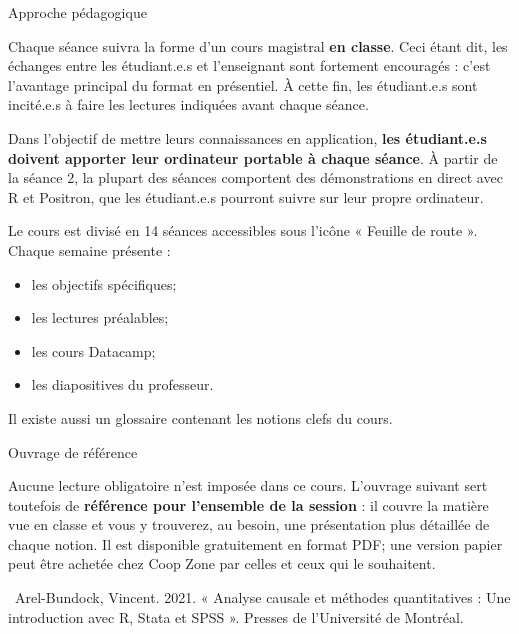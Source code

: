 \documentclass[10pt]{article}
\newcommand{\ulsub}[1]{%
  \needspace{3\baselineskip}%
  \vspace{10pt}%
  {\headfont\fontsize{12.5}{15}\selectfont #1}\par
  \vspace{2pt}%
}
\begin{document}
\ulsub{Approche pédagogique}
{\fontsize{9.5}{12.5}\selectfont
Chaque séance suivra la forme d'un cours magistral \textbf{en classe}. Ceci étant dit, les échanges entre les étudiant.e.s et l'enseignant sont fortement encouragés : c'est l'avantage principal du format en présentiel. À cette fin, les étudiant.e.s sont incité.e.s à faire les lectures indiquées avant chaque séance.\par
\vspace{6pt}
Dans l'objectif de mettre leurs connaissances en application, \textbf{les étudiant.e.s doivent apporter leur ordinateur portable à chaque séance}. À partir de la séance 2, la plupart des séances comportent des démonstrations en direct avec R et Positron, que les étudiant.e.s pourront suivre sur leur propre ordinateur.\par
\vspace{6pt}
Le cours est divisé en 14 séances accessibles sous l'icône « Feuille de route ». Chaque semaine présente :
\begin{itemize}
  \item les objectifs spécifiques;
  \item les lectures préalables;
  \item les cours Datacamp;
  \item les diapositives du professeur.
\end{itemize}
Il existe aussi un glossaire contenant les notions clefs du cours.\par}

\ulsub{Ouvrage de référence}
{\fontsize{9.5}{12.5}\selectfont
Aucune lecture obligatoire n'est imposée dans ce cours. L'ouvrage suivant sert toutefois de \textbf{référence pour l'ensemble de la session} : il couvre la matière vue en classe et vous y trouverez, au besoin, une présentation plus détaillée de chaque notion. Il est disponible gratuitement en format PDF; une version papier peut être achetée chez Coop Zone par celles et ceux qui le souhaitent.\par
\vspace{4pt}
\textbullet\ Arel-Bundock, Vincent. 2021. « Analyse causale et méthodes quantitatives : Une introduction avec R, Stata et SPSS ». Presses de l'Université de Montréal.\par}
\end{document}
